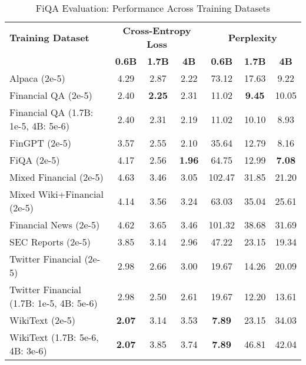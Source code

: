 
\begin{table}[htbp]
\centering
\caption[FiQA Evaluation: Cross-Dataset Performance]{FiQA Evaluation: Performance Across Training Datasets}
\label{tab:cross_fiqa}
\begin{tabular}{l|ccc|ccc}
\hline
\textbf{Training Dataset} & \multicolumn{3}{c|}{\textbf{Cross-Entropy Loss}} & \multicolumn{3}{c}{\textbf{Perplexity}} \\
\cline{2-4} \cline{5-7}
  & \textbf{0.6B} & \textbf{1.7B} & \textbf{4B} & \textbf{0.6B} & \textbf{1.7B} & \textbf{4B} \\
Alpaca (2e-5) & 4.29 & 2.87 & 2.22 & 73.12 & 17.63 & 9.22  \\
Financial QA (2e-5) & 2.40 & \textbf{2.25} & 2.31 & 11.02 & \textbf{9.45} & 10.05  \\
Financial QA (1.7B: 1e-5, 4B: 5e-6) & 2.40 & 2.31 & 2.19 & 11.02 & 10.10 & 8.93  \\
FinGPT (2e-5) & 3.57 & 2.55 & 2.10 & 35.64 & 12.79 & 8.16  \\
FiQA (2e-5) & 4.17 & 2.56 & \textbf{1.96} & 64.75 & 12.99 & \textbf{7.08}  \\
Mixed Financial (2e-5) & 4.63 & 3.46 & 3.05 & 102.47 & 31.85 & 21.20  \\
Mixed Wiki+Financial (2e-5) & 4.14 & 3.56 & 3.24 & 63.03 & 35.04 & 25.61  \\
Financial News (2e-5) & 4.62 & 3.65 & 3.46 & 101.32 & 38.68 & 31.69  \\
SEC Reports (2e-5) & 3.85 & 3.14 & 2.96 & 47.22 & 23.15 & 19.34  \\
Twitter Financial (2e-5) & 2.98 & 2.66 & 3.00 & 19.67 & 14.26 & 20.09  \\
Twitter Financial (1.7B: 1e-5, 4B: 5e-6) & 2.98 & 2.50 & 2.61 & 19.67 & 12.20 & 13.61  \\
WikiText (2e-5) & \textbf{2.07} & 3.14 & 3.53 & \textbf{7.89} & 23.15 & 34.03  \\
WikiText (1.7B: 5e-6, 4B: 3e-6) & \textbf{2.07} & 3.85 & 3.74 & \textbf{7.89} & 46.81 & 42.04  \\
\hline
\end{tabular}
\end{table}

